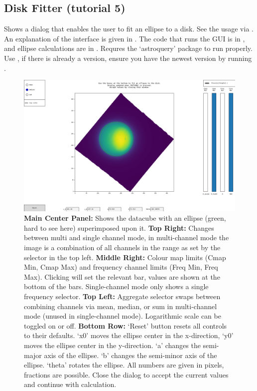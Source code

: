 \subsection{Disk Fitter (tutorial 5)}

Shows a dialog that enables the user to fit an ellipse to a disk. See the usage via . An explanation of the interface is given in . The code that runs the GUI is in , and ellipse calculations are in . Requres the `astroquery' package to run properly. Use , if there is already a version, ensure you have the newest version by running .

\begin{figure}[h!]
	\includegraphics[width=\textwidth]{figures/fitscube_disk_finder.png}
	\caption{\textbf{Main Center Panel:} Shows the datacube with an ellipse (green, hard to see here) superimposed upon it. \textbf{Top Right:} Changes between multi and single channel mode, in multi-channel mode the image is a combination of all channels in the range as set by the selector in the top left. \textbf{Middle Right:} Colour map limits (Cmap Min, Cmap Max) and frequency channel limits (Freq Min, Freq Max). Clicking will set the relevant bar, values are shown at the bottom of the bars. Single-channel mode only shows a single frequency selector. \textbf{Top Left:} Aggregate selector swaps between combining channels via mean, median, or sum in multi-channel mode (unused in single-channel mode). Logarithmic scale can be toggled on or off. \textbf{Bottom Row:} `Reset' button resets all controls to their defaults. `x{\textunderscore}0' moves the ellipse center in the x-direction, `y{\textunderscore}0' moves the ellipse center in the y-direction. `a' changes the semi-major axis of the ellipse. `b' changes the semi-minor axis of the ellipse. `theta' rotates the ellipse. All numbers are given in pixels, fractions are possible. Close the dialog to accept the current values and continue with calculation.}
\label{fig:disk_fitter}
\end{figure}



